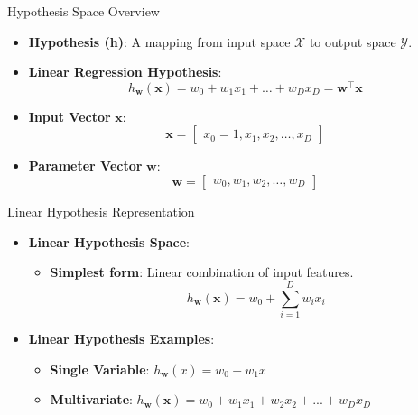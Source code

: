 \documentclass[serif, aspectratio=169]{beamer}
\begin{document}
    \begin{frame}{Hypothesis Space Overview}
        \begin{itemize}
            \item \textbf{Hypothesis (h)}: A mapping from input space \( \mathcal{X} \) to output space \( \mathcal{Y} \).
            \item \textbf{Linear Regression Hypothesis}:
            \[
                h_{\mathbf{w}}(\mathbf{x}) = w_0 + w_1 x_1 + \dots + w_D x_D = \mathbf{w}^\top \mathbf{x}
            \]
            \item \textbf{Input Vector} \( \mathbf{x} \):
            \[
                \mathbf{x} = \begin{bmatrix} x_0 = 1, x_1, x_2, \dots, x_D \end{bmatrix}
            \]
            \item \textbf{Parameter Vector} \( \mathbf{w} \):
            \[
                \mathbf{w} = \begin{bmatrix} w_0, w_1, w_2, \dots, w_D \end{bmatrix}
            \]
        \end{itemize}
    \end{frame}





    \begin{frame}{Linear Hypothesis Representation}
        \begin{itemize}
            \item \textbf{Linear Hypothesis Space}:
            \begin{itemize}
                \item \textbf{Simplest form}: Linear combination of input features.
                \[
                    h_{\mathbf{w}}(\mathbf{x}) = w_0 + \sum_{i=1}^{D} w_i x_i
                \]
            \end{itemize}
            \item \textbf{Linear Hypothesis Examples}:
            \begin{itemize}
                \item \textbf{Single Variable}: \( h_{\mathbf{w}}(x) = w_0 + w_1 x \)
                \item \textbf{Multivariate}: \( h_{\mathbf{w}}(\mathbf{x}) = w_0 + w_1 x_1 + w_2 x_2 + ... + w_D x_D \)
            \end{itemize}
        \end{itemize}
    \end{frame}
\end{document}
